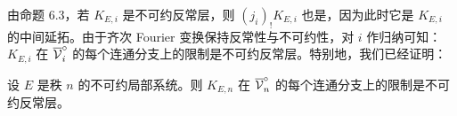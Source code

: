 由命题 6.3，若 $K_{E,i}$ 是不可约反常层，则 $(j_i)_!K_{E,i}$ 也是，因为此时它是 $K_{E,i}$ 的中间延拓。由于齐次 Fourier 变换保持反常性与不可约性，对 $i$ 作归纳可知：$K_{E,i}$ 在 $\overline{\mathcal{V}}^\circ_i$ 的每个连通分支上的限制是不可约反常层。特别地，我们已经证明：

\begin{corollary}
设 $E$ 是秩 $n$ 的不可约局部系统。则 $K_{E,n}$ 在 $\overline{\mathcal{V}}^\circ_n$ 的每个连通分支上的限制是不可约反常层。
\end{corollary}
